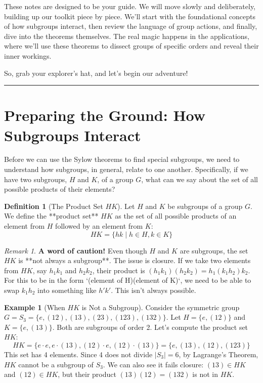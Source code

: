 \documentclass[12pt,a4paper]{article}
\theoremstyle{plain} %
\theoremstyle{definition} %
\newtheorem{definition}[theorem]{Definition}
\newtheorem{example}[theorem]{Example}
\theoremstyle{remark} %
\newtheorem*{remark}{Remark}
\begin{document}
These notes are designed to be your guide. We will move slowly and deliberately, building up our toolkit piece by piece. We'll start with the foundational concepts of how subgroups interact, then review the language of group actions, and finally, dive into the theorems themselves. The real magic happens in the applications, where we'll use these theorems to dissect groups of specific orders and reveal their inner workings.

So, grab your explorer's hat, and let's begin our adventure!

\vfill
\begin{center}
\rule{0.5\textwidth}{0.4pt}
\end{center}
\vfill

\tableofcontents
\newpage

\section{Preparing the Ground: How Subgroups Interact}

Before we can use the Sylow theorems to find special subgroups, we need to understand how subgroups, in general, relate to one another. Specifically, if we have two subgroups, $H$ and $K$, of a group $G$, what can we say about the set of all possible products of their elements?

\begin{definition}[The Product Set $HK$]
Let $H$ and $K$ be subgroups of a group $G$. We define the **product set** $HK$ as the set of all possible products of an element from $H$ followed by an element from $K$:
\[
HK = \{ hk \mid h \in H, k \in K \}
\]
\end{definition}

\begin{remark}
\textbf{A word of caution!} Even though $H$ and $K$ are subgroups, the set $HK$ is **not always a subgroup**. The issue is closure. If we take two elements from $HK$, say $h_1k_1$ and $h_2k_2$, their product is $(h_1k_1)(h_2k_2) = h_1(k_1h_2)k_2$. For this to be in the form `(element of H)(element of K)`, we need to be able to swap $k_1h_2$ into something like $h'k'$. This isn't always possible.
\end{remark}

\begin{example}[When $HK$ is Not a Subgroup]
Consider the symmetric group $G = S_3 = \{e, (12), (13), (23), (123), (132)\}$.
Let $H = \{e, (12)\}$ and $K = \{e, (13)\}$. Both are subgroups of order 2.
Let's compute the product set $HK$:
\[
HK = \{e \cdot e, e \cdot (13), (12) \cdot e, (12) \cdot (13)\} = \{e, (13), (12), (123)\}
\]
This set has 4 elements. Since 4 does not divide $|S_3|=6$, by Lagrange's Theorem, $HK$ cannot be a subgroup of $S_3$. We can also see it fails closure: $(13) \in HK$ and $(12) \in HK$, but their product $(13)(12)=(132)$ is not in $HK$.
\end{example}
\end{document}
